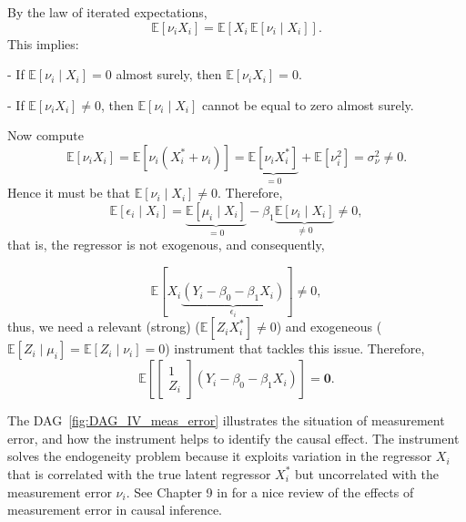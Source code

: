 By the law of iterated expectations, 
\[
\mathbb{E}[\nu_i X_i] = \mathbb{E}\!\left[X_i \, \mathbb{E}[\nu_i \mid X_i]\right].
\]
This implies:

- If $\mathbb{E}[\nu_i \mid X_i] = 0$ almost surely, then $\mathbb{E}[\nu_i X_i] = 0$.  

- If $\mathbb{E}[\nu_i X_i] \neq 0$, then $\mathbb{E}[\nu_i \mid X_i]$ cannot be equal to zero almost surely.

Now compute
\[
\mathbb{E}[\nu_iX_i] 
= \mathbb{E}[\nu_i(X_i^*+\nu_i)]
= \underbrace{\mathbb{E}[\nu_i X_i^*]}_{=0} + \mathbb{E}[\nu_i^2]
= \sigma^2_{\nu} \neq 0.
\]
Hence it must be that $\mathbb{E}[\nu_i\mid X_i]\neq 0$. Therefore,
\[
\mathbb{E}[\epsilon_i\mid X_i]
=\underbrace{\mathbb{E}[\mu_i\mid X_i]}_{=0}
- \beta_1\underbrace{\mathbb{E}[\nu_i\mid X_i]}_{\neq 0}
\neq 0,
\]
that is, the regressor is not exogenous, and consequently,

\[
\mathbb{E}[X_i\underbrace{(Y_i-\beta_0-\beta_1X_i)}_{\epsilon_i}]\neq 0,
\] 
thus, we need a relevant (strong) ($\mathbb{E}[Z_iX_i^*]\neq 0$) and exogeneous ($\mathbb{E}[Z_i\mid \mu_i]=\mathbb{E}[Z_i\mid \nu_i]= 0$) instrument that tackles this issue. Therefore,
\[
\mathbb{E}\left[\begin{bmatrix}
	1\\
	Z_i
\end{bmatrix}(Y_i-\beta_0-\beta_1X_i)\right]=\mathbf{0}.
\] 

The DAG~\ref{fig:DAG_IV_meas_error} illustrates the situation of measurement error, and how the instrument helps to identify the causal effect. The instrument solves the endogeneity problem because it exploits variation in the regressor $X_i$ that is correlated with the true latent regressor $X_i^*$ but uncorrelated with the measurement error $\nu_i$. See Chapter 9 in \cite{hernan2020causal} for a nice review of the effects of measurement error in causal inference.

